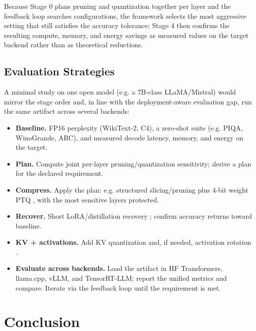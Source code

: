 Because Stage 0 plans pruning and quantization together per layer and the feedback loop searches configurations, the framework selects the most aggressive setting that still satisfies the accuracy tolerance; Stage 4 then confirms the resulting compute, memory, and energy savings as measured values on the target backend rather than as theoretical reductions.

\subsection{Evaluation Strategies}

A minimal study on one open model (e.g. a 7B-class LLaMA/Mistral) would mirror the stage order and, in line with the deployment-aware evaluation gap, run the same artifact across several backends:

\begin{itemize}

  \item \textbf{Baseline.} FP16 perplexity (WikiText-2, C4), a zero-shot suite (e.g. PIQA, WinoGrande, ARC), and measured decode latency, memory, and energy on the target.

  \item \textbf{Plan.} Compute joint per-layer pruning/quantization sensitivity; derive a plan for the declared requirement.

  \item \textbf{Compress.} Apply the plan: e.g. structured slicing/pruning \cite{ma2023llmpruner,ashkboos2024slicegpt} plus 4-bit weight PTQ \cite{frantar2023gptq,lin2024awq}, with the most sensitive layers protected.

  \item \textbf{Recover.} Short LoRA/distillation recovery \cite{muralidharan2024minitron}; confirm accuracy returns toward baseline.

  \item \textbf{KV + activations.} Add KV quantization \cite{hooper2024kvquant} and, if needed, activation rotation \cite{ashkboos2024quarot}.

  \item \textbf{Evaluate across backends.} Load the artifact in HF Transformers, llama.cpp, vLLM, and TensorRT-LLM; report the unified metrics and compare. Iterate via the feedback loop until the requirement is met.

\end{itemize}

\section{Conclusion}
\label{sec:lr-conclusion}

